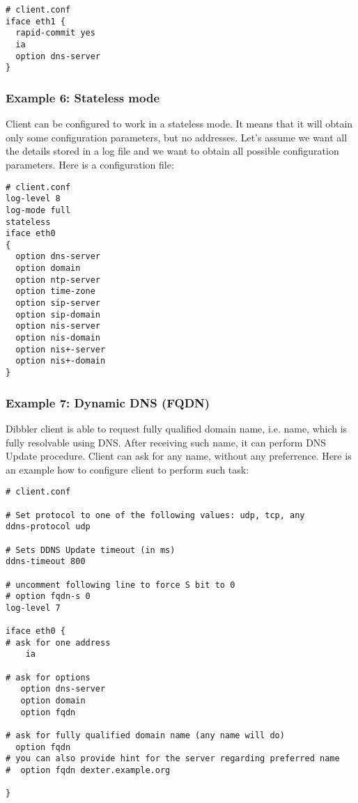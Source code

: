 \begin{lstlisting}
# client.conf
iface eth1 {
  rapid-commit yes
  ia
  option dns-server
}
\end{lstlisting}

\subsubsection{Example 6: Stateless mode}
Client can be configured to work in a stateless mode. It means that it
will obtain only some configuration parameters, but no
addresses. Let's assume we want all the details stored in a log file and
we want to obtain all possible configuration parameters. Here is a
configuration file:

\begin{lstlisting}
# client.conf
log-level 8
log-mode full
stateless
iface eth0
{
  option dns-server
  option domain
  option ntp-server
  option time-zone
  option sip-server
  option sip-domain
  option nis-server
  option nis-domain
  option nis+-server
  option nis+-domain
}
\end{lstlisting}

\subsubsection{Example 7: Dynamic DNS (FQDN)}
\label{example-client-fqdn}
Dibbler client is able to request fully qualified domain name,
i.e. name, which is fully resolvable using DNS. After receiving such
name, it can perform DNS Update procedure. Client can ask for any
name, without any preferrence. Here is an example how to configure
client to perform such task:
\begin{lstlisting}
# client.conf

# Set protocol to one of the following values: udp, tcp, any
ddns-protocol udp

# Sets DDNS Update timeout (in ms)
ddns-timeout 800

# uncomment following line to force S bit to 0
# option fqdn-s 0
log-level 7

iface eth0 {
# ask for one address
    ia

# ask for options
   option dns-server
   option domain
   option fqdn

# ask for fully qualified domain name (any name will do)
  option fqdn
# you can also provide hint for the server regarding preferred name
#  option fqdn dexter.example.org

}
\end{lstlisting}

